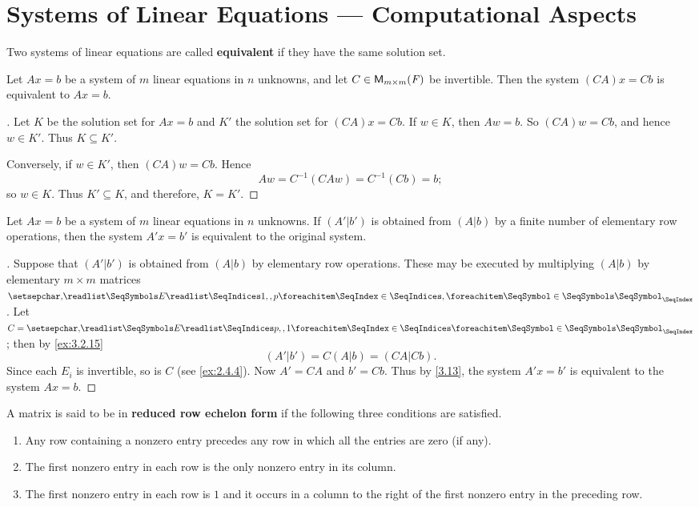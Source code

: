 \section{Systems of Linear Equations --- Computational Aspects}\label{sec:3.4}

\begin{defn}\label{3.4.1}
	Two systems of linear equations are called \textbf{equivalent} if they have the same solution set.
\end{defn}

\begin{thm}\label{3.13}
	Let \(Ax = b\) be a system of \(m\) linear equations in \(n\) unknowns, and let \(C \in \mathsf{M}_{{m} \times m}({\mathit{F}})\) be invertible.
	Then the system \((CA)x = Cb\) is equivalent to \(Ax = b\).
\end{thm}

\begin{proof}[]
	Let \(K\) be the solution set for \(Ax = b\) and \(K'\) the solution set for \((CA)x = Cb\).
	If \(w \in K\), then \(Aw = b\).
	So \((CA)w = Cb\), and hence \(w \in K'\).
	Thus \(K \subseteq K'\).

	Conversely, if \(w \in K'\), then \((CA)w = Cb\).
	Hence
	\[
		Aw = C^{-1} (CAw) = C^{-1} (Cb) = b;
	\]
	so \(w \in K\).
	Thus \(K' \subseteq K\), and therefore, \(K = K'\).
\end{proof}

\begin{cor}\label{3.4.2}
	Let \(Ax = b\) be a system of \(m\) linear equations in \(n\) unknowns.
	If \((A' | b')\) is obtained from \((A | b)\) by a finite number of elementary row operations, then the system \(A' x = b'\) is equivalent to the original system.
\end{cor}

\begin{proof}[]
	Suppose that \((A' | b')\) is obtained from \((A | b)\) by elementary row operations.
	These may be executed by multiplying \((A | b)\) by elementary \(m \times m\) matrices \(\seq{E}{1,,p}\).
	Let \(C = \seq[]{E}{p,,1}\);
	then by \cref{ex:3.2.15}
	\[
		(A' | b') = C (A | b) = (CA | Cb).
	\]
	Since each \(E_i\) is invertible, so is \(C\)
	(see \cref{ex:2.4.4}).
	Now \(A' = CA\) and \(b' = Cb\).
	Thus by \cref{3.13}, the system \(A' x = b'\) is equivalent to the system \(Ax = b\).
\end{proof}

\begin{defn}\label{3.4.3}
	A matrix is said to be in \textbf{reduced row echelon form} if the following three conditions are satisfied.
	\begin{enumerate}
		\item Any row containing a nonzero entry precedes any row in which all the entries are zero (if any).
		\item The first nonzero entry in each row is the only nonzero entry in its column.
		\item The first nonzero entry in each row is \(1\) and it occurs in a column to the right of the first nonzero entry in the preceding row.
	\end{enumerate}
\end{defn}


